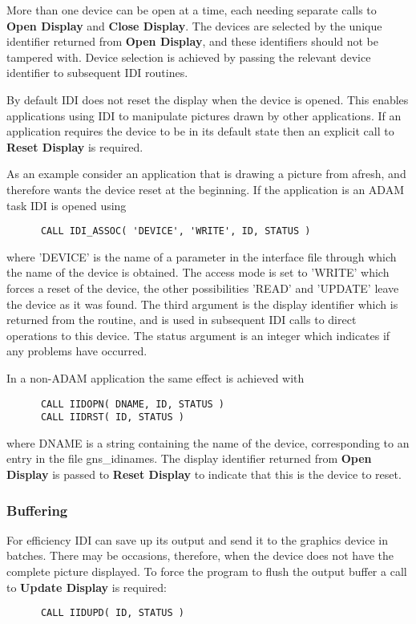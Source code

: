 More than one device can be open at a time, each needing separate calls
to {\bf Open Display} and {\bf Close Display}. The devices are selected
by the unique identifier returned from {\bf Open Display}, and these
identifiers should not be tampered with. Device selection is achieved by
passing the relevant device identifier to subsequent IDI routines.

By default IDI does not reset the display when the device is opened.
This enables applications using IDI to manipulate pictures drawn by
other applications. If an application requires the device to be in its
default state then an explicit call to {\bf Reset Display} is required.

As an example consider an application that is drawing a picture from
afresh, and therefore wants the device reset at the beginning. If the
application is an ADAM task IDI is opened using
\begin{small}
\begin{verbatim}
      CALL IDI_ASSOC( 'DEVICE', 'WRITE', ID, STATUS )
\end{verbatim}
\end{small}
where 'DEVICE' is the name of a parameter in the interface file
through which the name of the device is obtained. The access mode
is set to 'WRITE' which forces a reset of the device, the other
possibilities 'READ' and 'UPDATE' leave the device as it was found.
The third argument is the display identifier which is returned from
the routine, and is used in subsequent IDI calls to direct operations
to this device. The status argument is an integer which indicates if
any problems have occurred.

In a non-ADAM application the same effect is achieved with
\begin{small}
\begin{verbatim}
      CALL IIDOPN( DNAME, ID, STATUS )
      CALL IIDRST( ID, STATUS )
\end{verbatim}
\end{small}
where DNAME is a string containing the name of the device, corresponding
to an entry in the file gns\_idinames. The display identifier returned
from {\bf Open Display} is passed to {\bf Reset Display} to indicate
that this is the device to reset.

\subsubsection{Buffering}

For efficiency IDI can save up its output and send it to the graphics
device in batches. There may be occasions, therefore, when the device does
not have the complete picture displayed. To force the program to flush the
output buffer a call to {\bf Update Display} is required:
\begin{small}
\begin{verbatim}
      CALL IIDUPD( ID, STATUS )
\end{verbatim}
\end{small}

